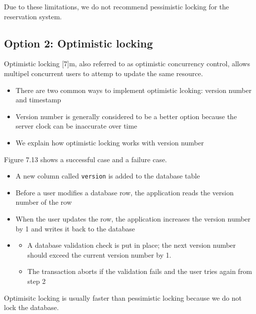 \documentclass{report}
\theoremstyle{definition}
\let\oldsubsection\subsection
\renewcommand{\subsection}{\oldsubsection*}
\begin{document}
Due to these limitations, we do not recommend pessimistic locking for the reservation system.

\subsection{Option 2: Optimistic locking}

Optimistic locking [7]m, also referred to as optimistic concurrency control, allows multipel concurrent users to attemp to update the same resource.

\begin{itemize}
\item
There are two common ways to implement optimistic lcoking: version number and timestamp
\item
Version number is generally considered to be a better option because the server clock can be inaccurate over time
\item
We explain how optimistic locking works with version number
\end{itemize}

Figure 7.13 shows a successful case and a failure case.

\begin{itemize}
\item
A new column called \lstinline|version| is added to the database table
\item
Before a user modifies a database row, the application reads the version number of the row
\item
When the user updates the row, the application increases the version number by 1 and writes it back to the database
\item

\begin{itemize}
\item
A database validation check is put in place; the next version number should exceed the current version number by 1.
\item
The transaction aborts if the validation fails and the user tries again from step 2
\end{itemize}
\end{itemize}

Optimisitc locking is usually faster than pessimistic locking because we do not lock the database.
\end{document}
